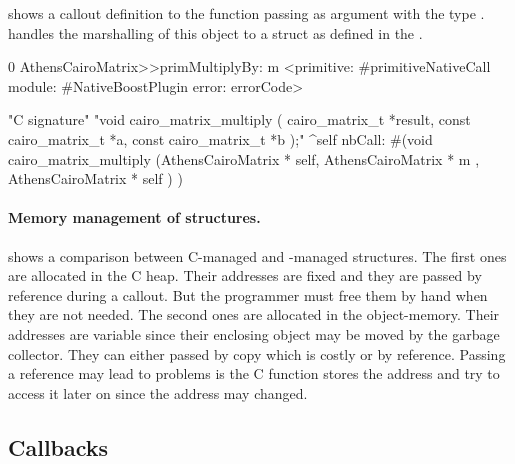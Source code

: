 \noindent {} shows a callout definition to the
  function passing  as argument with the type .
\NB handles the marshalling of this object to a struct as defined in the .

\begin{stcode}[
	label={lst:ffi-cairoCallouts},
	caption={Example of callouts using \ttt{cairo\_matrix\_t}}]{0}
AthensCairoMatrix>>primMultiplyBy: m
	<primitive: #primitiveNativeCall
	 module: #NativeBoostPlugin
     error: errorCode>

"C signature"
"void cairo_matrix_multiply (
                     cairo_matrix_t *result,
                     const cairo_matrix_t *a,
                     const cairo_matrix_t *b );"
	^self nbCall: #(void   cairo_matrix_multiply
		(AthensCairoMatrix * self,
		AthensCairoMatrix * m ,
		AthensCairoMatrix * self ) )
\end{stcode}


\paragraph{Memory management of structures.}
 shows a comparison between C-managed and \PH-managed structures.
The first ones are allocated in the C heap.
Their addresses are fixed and they are passed by reference during a callout.
But the programmer must free them by hand when they are not needed.
The second ones are allocated in the \PH object-memory.
Their addresses are variable since their enclosing object may be moved by the garbage collector.
They can either passed by copy which is costly or by reference.
Passing a reference may lead to problems is the C function stores the address and try to access it later on since the address may changed.


\subsection{Callbacks}

